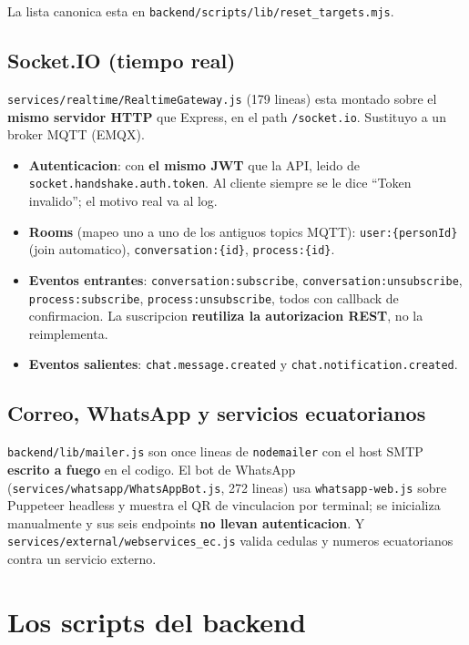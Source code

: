 \documentclass[11pt,a4paper,oneside]{report}
\newcommand{\rt}[1]{\texttt{#1}}
\begin{document}
La lista canonica esta en \rt{backend/scripts/lib/reset\_targets.mjs}.

\subsection{Socket.IO (tiempo real)}

\rt{services/realtime/RealtimeGateway.js} (179 lineas) esta montado sobre el \textbf{mismo
servidor HTTP} que Express, en el path \rt{/socket.io}. Sustituyo a un broker MQTT (EMQX).

\begin{itemize}[leftmargin=1.4em]
  \item \textbf{Autenticacion}: con \textbf{el mismo JWT} que la API, leido de
        \rt{socket.handshake.auth.token}. Al cliente siempre se le dice ``Token invalido''; el
        motivo real va al log.
  \item \textbf{Rooms} (mapeo uno a uno de los antiguos topics MQTT): \rt{user:\{personId\}}
        (join automatico), \rt{conversation:\{id\}}, \rt{process:\{id\}}.
  \item \textbf{Eventos entrantes}: \rt{conversation:subscribe}, \rt{conversation:unsubscribe},
        \rt{process:subscribe}, \rt{process:unsubscribe}, todos con callback de confirmacion.
        La suscripcion \textbf{reutiliza la autorizacion REST}, no la reimplementa.
  \item \textbf{Eventos salientes}: \rt{chat.message.created} y \rt{chat.notification.created}.
\end{itemize}

\subsection{Correo, WhatsApp y servicios ecuatorianos}

\rt{backend/lib/mailer.js} son once lineas de \rt{nodemailer} con el host SMTP
\textbf{escrito a fuego} en el codigo. El bot de WhatsApp
(\rt{services/whatsapp/WhatsAppBot.js}, 272 lineas) usa \rt{whatsapp-web.js} sobre Puppeteer
headless y muestra el QR de vinculacion por terminal; se inicializa manualmente y sus seis
endpoints \textbf{no llevan autenticacion}. Y \rt{services/external/webservices\_ec.js} valida
cedulas y numeros ecuatorianos contra un servicio externo.

\section{Los scripts del backend}
\end{document}
